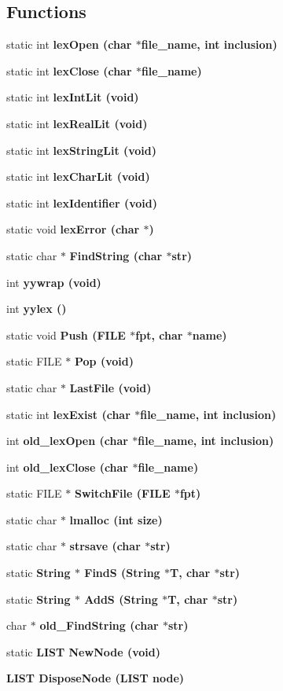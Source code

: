 \subsection*{Functions}
\begin{CompactItemize}
\item 
static int \bf{lex\-Open} (char $\ast$file\_\-name, int inclusion)
\item 
static int \bf{lex\-Close} (char $\ast$file\_\-name)
\item 
static int \bf{lex\-Int\-Lit} (void)
\item 
static int \bf{lex\-Real\-Lit} (void)
\item 
static int \bf{lex\-String\-Lit} (void)
\item 
static int \bf{lex\-Char\-Lit} (void)
\item 
static int \bf{lex\-Identifier} (void)
\item 
static void \bf{lex\-Error} (char $\ast$)
\item 
static char $\ast$ \bf{Find\-String} (char $\ast$str)
\item 
int \bf{yywrap} (void)
\item 
int \bf{yylex} ()
\item 
static void \bf{Push} (FILE $\ast$fpt, char $\ast$\bf{name})
\item 
static FILE $\ast$ \bf{Pop} (void)
\item 
static char $\ast$ \bf{Last\-File} (void)
\item 
static int \bf{lex\-Exist} (char $\ast$file\_\-name, int inclusion)
\item 
int \bf{old\_\-lex\-Open} (char $\ast$file\_\-name, int inclusion)
\item 
int \bf{old\_\-lex\-Close} (char $\ast$file\_\-name)
\item 
static FILE $\ast$ \bf{Switch\-File} (FILE $\ast$fpt)
\item 
static char $\ast$ \bf{lmalloc} (int size)
\item 
static char $\ast$ \bf{strsave} (char $\ast$str)
\item 
static \bf{String} $\ast$ \bf{Find\-S} (\bf{String} $\ast$T, char $\ast$str)
\item 
static \bf{String} $\ast$ \bf{Add\-S} (\bf{String} $\ast$T, char $\ast$str)
\item 
char $\ast$ \bf{old\_\-Find\-String} (char $\ast$str)
\item 
static \bf{LIST} \bf{New\-Node} (void)
\item 
\bf{LIST} \bf{Dispose\-Node} (\bf{LIST} \bf{node})

\end{CompactItemize}
